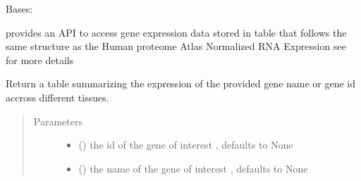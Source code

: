\documentclass[letterpaper,10pt,english]{sphinxmanual}
\begin{document}
\begin{fulllineitems}
\label{\detokenize{IPTK.Classes:IPTK.Classes.Database.GeneExpressionDB}}
Bases: 

provides an API to access gene expression data stored in table that follows the same structure as 
the Human proteome Atlas Normalized RNA Expression see   for more details

\begin{fulllineitems}
\label{\detokenize{IPTK.Classes:IPTK.Classes.Database.GeneExpressionDB.get_expression}}
Return a table summarizing the expression of the provided gene name or gene id accross different tissues.
\begin{quote}\begin{description}
\item[{Parameters}] \leavevmode\begin{itemize}
\item {} 
 (\sphinxstyleliteralemphasis{\sphinxupquote{, }}) \textendash{} the id of the gene of interest , defaults to None

\item {} 
 (\sphinxstyleliteralemphasis{\sphinxupquote{{[}}}\sphinxstyleliteralemphasis{\sphinxupquote{{]}}}\sphinxstyleliteralemphasis{\sphinxupquote{, }}) \textendash{} the name of the gene of interest , defaults to None


\end{itemize}
\end{description}
\end{quote}
\end{fulllineitems}
\end{fulllineitems}
\end{document}
